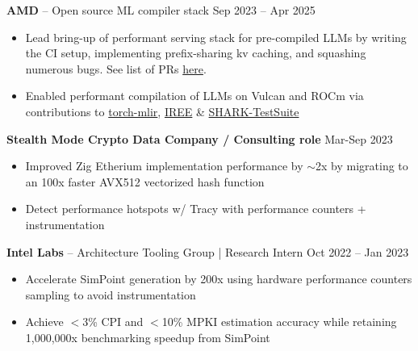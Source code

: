 \documentclass[10pt,letterpaper]{article}
\begin{document}
\vspace{3pt}
\textbf{AMD} -- Open source ML compiler stack \hfill Sep 2023 -- Apr 2025
\begin{itemize}
    \item Lead bring-up of performant serving stack for pre-compiled LLMs by writing the CI setup, implementing prefix-sharing kv caching, and squashing numerous bugs. See list of PRs \href{https://github.com/nod-ai/shark-ai/pulls?q=is\%3Apr+author\%3Arenxida}{here}.
    \item Enabled performant compilation of LLMs on Vulcan and ROCm via contributions to \href{https://github.com/llvm/torch-mlir/pulls?q=is\%3Apr+author\%3Arenxida}{torch-mlir}, \href{https://github.com/iree-org/iree}{IREE} \& \href{https://github.com/nod-ai/SHARK-TestSuite/pulls?q=is\%3Apr+author\%3Arenxida}{SHARK-TestSuite}
\end{itemize}

\vspace{3pt}
\textbf{Stealth Mode Crypto Data Company / Consulting role} \hfill Mar-Sep 2023
\begin{itemize}
    \item Improved Zig Etherium implementation performance by $\sim$2x by migrating to an 100x faster AVX512 vectorized hash function
    \item Detect performance hotspots w/ Tracy with performance counters + instrumentation
\end{itemize}

\vspace{3pt}
\textbf{Intel Labs} -- Architecture Tooling Group | Research Intern \hfill Oct 2022 -- Jan 2023
\begin{itemize}
    \item Accelerate SimPoint generation by 200x using hardware performance counters sampling to avoid instrumentation
    \item Achieve $<$3\% CPI and $<$10\% MPKI estimation accuracy while retaining 1,000,000x benchmarking speedup from SimPoint
\end{itemize}
\end{document}
